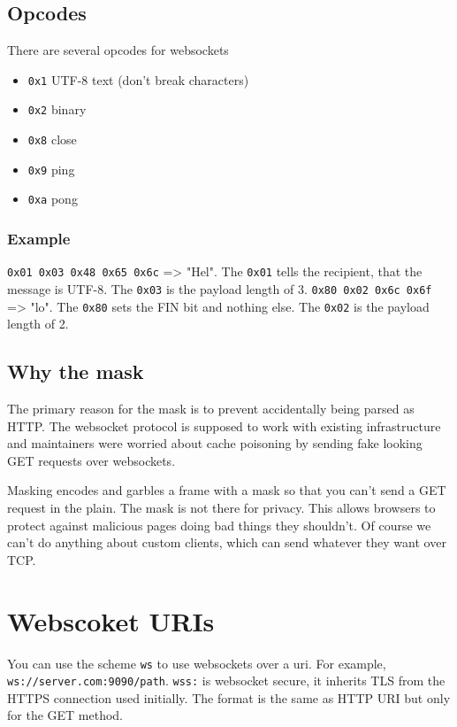 \documentclass[../CMPUT-404-Notes.tex]{subfiles}
\begin{document}
\subsection{Opcodes}
There are several opcodes for websockets
\begin{itemize}
    \item \texttt{0x1} UTF-8 text (don't break characters)
    \item \texttt{0x2} binary
    \item \texttt{0x8} close
    \item \texttt{0x9} ping
    \item \texttt{0xa} pong
\end{itemize}

\subsubsection{Example}
\texttt{0x01 0x03 0x48 0x65 0x6c} => "Hel".
The \texttt{0x01} tells the recipient, that the message is UTF-8. 
The \texttt{0x03} is the payload length of 3.
\texttt{0x80 0x02 0x6c 0x6f} => "lo".
The \texttt{0x80} sets the FIN bit and nothing else.
The \texttt{0x02} is the payload length of 2.

\subsection{Why the mask}
The primary reason for the mask is to prevent accidentally being parsed as HTTP. 
The websocket protocol is supposed to work with existing infrastructure and maintainers were worried about cache poisoning by sending fake looking GET requests over websockets.

Masking encodes and garbles a frame with a mask so that you can't send a GET request in the plain. The mask is not there for privacy.
This allows browsers to protect against malicious pages doing bad things they shouldn't.
Of course we can't do anything about custom clients, which can send whatever they want over TCP.

\section{Webscoket URIs}
You can use the scheme \texttt{ws} to use websockets over a uri. For example, \texttt{ws://server.com:9090/path}.
\texttt{wss:} is websocket secure, it inherits TLS from the HTTPS connection used initially. 
The format is the same as HTTP URI but only for the GET method.
\end{document}
